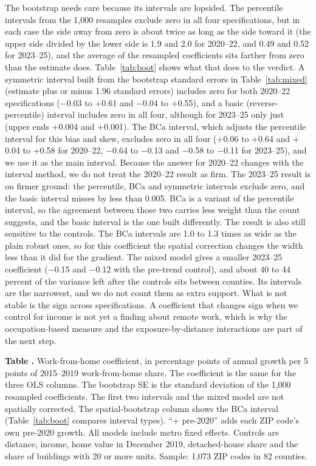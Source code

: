 \documentclass[11pt]{article}
\newcounter{tabnum}
\newcommand{\tab}[3]{%
  \begin{table}[!tbp]\centering
  \refstepcounter{tabnum}\label{#2}%
  {\small\raggedright\textbf{Table \thetabnum.} #3\par}\vspace{3pt}
  
  \end{table}}
\begin{document}
The bootstrap needs care because its intervals are lopsided. The percentile intervals from the 1,000 resamples exclude zero in all
four specifications, but in each case the side away from zero is about twice as long as the side toward it (the upper side divided
by the lower side is 1.9 and 2.0 for 2020--22, and 0.49 and 0.52 for 2023--25), and the average of the resampled coefficients sits
farther from zero than the estimate does. Table~\ref{tab:boot} shows what that does to the verdict. A symmetric interval built from
the bootstrap standard errors in Table~\ref{tab:mixed} (estimate plus or minus 1.96 standard errors) includes zero for both 2020--22
specifications ($-$0.03 to $+$0.61 and $-$0.04 to $+$0.55), and a basic (reverse-percentile) interval includes zero in all four,
although for 2023--25 only just (upper ends $+$0.004 and $+$0.001). The BCa interval, which adjusts the percentile interval for this
bias and skew, excludes zero in all four ($+$0.06 to $+$0.64 and $+$0.04 to $+$0.58 for 2020--22, $-$0.64 to $-$0.13 and $-$0.58 to $-$0.11
for 2023--25), and we use it as the main interval. Because the answer for 2020--22 changes with the interval method, we do not treat
the 2020--22 result as firm. The 2023--25 result is on firmer ground: the percentile, BCa and symmetric intervals exclude zero, and the basic interval
misses by less than 0.005. BCa is a variant of the percentile interval, so the agreement between those two carries less weight than the
count suggests, and the basic interval is the one built differently. The result is also still sensitive to the controls. The BCa intervals are 1.0 to 1.3 times as wide as the plain
robust ones, so for this coefficient the spatial correction changes the width less than it did for the gradient. The mixed model gives a smaller
2023--25 coefficient ($-$0.15 and $-$0.12 with the pre-trend control), and about 40 to 44 percent of the variance left after the
controls sits between counties. Its intervals are the narrowest, and we do not count them as extra support. What is not stable is
the sign across specifications. A coefficient that changes sign when we control for income is not yet a finding about remote work,
which is why the occupation-based measure and the exposure-by-distance interactions are part of the next step.

\tab{t_m_mixed}{tab:mixed}{Work-from-home coefficient, in percentage points of annual growth per 5 points of 2015--2019
work-from-home share. The coefficient is the same for the three OLS columns. The bootstrap SE is the standard deviation of the
1,000 resampled coefficients. The first two intervals and the mixed model are not spatially corrected. The spatial-bootstrap column
shows the BCa interval (Table~\ref{tab:boot} compares interval types). ``+ pre-2020'' adds each ZIP code's own pre-2020 growth. All models
include metro fixed effects. Controls are distance, income, home value in December 2019, detached-house share and the share of
buildings with 20 or more units. Sample: 1,073 ZIP codes in 82 counties.}
\end{document}

